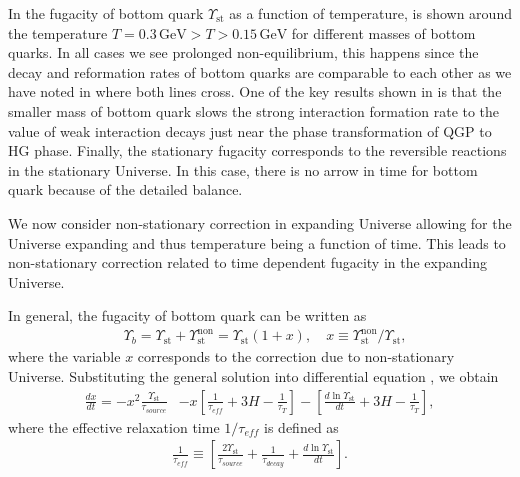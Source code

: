 In  the fugacity of bottom quark $\Upsilon_{\mathrm{st}}$ as a function of temperature,  is shown around the temperature $T=0.3\,\mathrm{GeV}>T>0.15\,\mathrm{GeV}$ for different masses of bottom quarks. In all cases we see prolonged non-equilibrium, this happens since the decay and reformation rates of bottom quarks are comparable to each other as we have noted in  where both lines cross. One of the key results shown in  is that the smaller mass of bottom quark slows the strong interaction formation rate to the value of weak interaction decays just near the phase transformation of QGP to HG phase. Finally, the stationary fugacity corresponds to the reversible reactions in the stationary Universe. In this case, there is no arrow in time for bottom quark because of the detailed balance.

We now consider non-stationary correction in expanding Universe allowing for the Universe  expanding and thus temperature being a function of time. This leads to non-stationary correction related to time dependent fugacity in the expanding Universe. 

In general, the fugacity of bottom quark can be written as 
\begin{align}\label{Nonstationary_sol}
&\Upsilon_b=\Upsilon_{\mathrm{st}}+\Upsilon^{\mathrm{non}}_{\mathrm{st}}=\Upsilon_\mathrm{st}\left(1+x\right),\quad x\equiv{\Upsilon_\mathrm{st}^{\mathrm{non}}}/{\Upsilon_\mathrm{st}},
\end{align}
where the variable $x$ corresponds to the correction due to non-stationary Universe. Substituting the general solution  into differential equation , we obtain
\begin{align}\label{Nonstationary_eq}
\frac{dx}{dt}=-x^2\frac{\Upsilon_\mathrm{st}}{\tau_{source}}&-x\left[\frac{1}{\tau_{eff}}+3H-\frac{1}{\tau_T}\right]-\left[\frac{d\ln\Upsilon_\mathrm{st}}{dt}+3H-\frac{1}{\tau_T}\right],
\end{align}
where the effective relaxation time $1/\tau_{eff}$ is defined as
\begin{align}
\frac{1}{\tau_{eff}}\equiv\left[\frac{2\Upsilon_\mathrm{st}}{\tau_{source}}+\frac{1}{\tau_{decay}}+\frac{d\ln\Upsilon_\mathrm{st}}{dt}\right].
\end{align}


